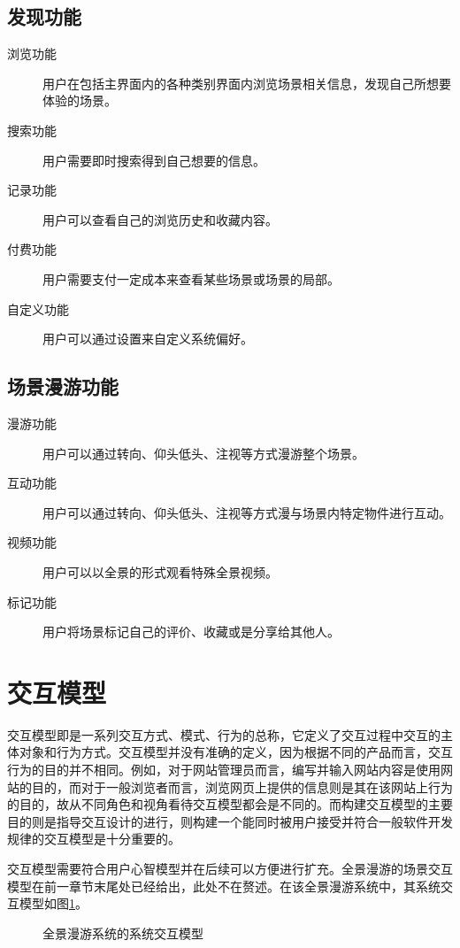 \subsection{发现功能}
\begin{description}
	\item [浏览功能] 用户在包括主界面内的各种类别界面内浏览场景相关信息，发现自己所想要体验的场景。
	\item [搜索功能] 用户需要即时搜索得到自己想要的信息。
	\item [记录功能] 用户可以查看自己的浏览历史和收藏内容。
	\item [付费功能] 用户需要支付一定成本来查看某些场景或场景的局部。
	\item [自定义功能] 用户可以通过设置来自定义系统偏好。
\end{description}

\subsection{场景漫游功能}

\begin{description}
	\item [漫游功能] 用户可以通过转向、仰头低头、注视等方式漫游整个场景。
	\item [互动功能] 用户可以通过转向、仰头低头、注视等方式漫与场景内特定物件进行互动。
	\item [视频功能] 用户可以以全景的形式观看特殊全景视频。
	\item [标记功能] 用户将场景标记自己的评价、收藏或是分享给其他人。
\end{description}

\section{交互模型}
交互模型即是一系列交互方式、模式、行为的总称，它定义了交互过程中交互的主体对象和行为方式。交互模型并没有准确的定义，因为根据不同的产品而言，交互行为的目的并不相同。例如，对于网站管理员而言，编写并输入网站内容是使用网站的目的，而对于一般浏览者而言，浏览网页上提供的信息则是其在该网站上行为的目的，故从不同角色和视角看待交互模型都会是不同的。而构建交互模型的主要目的则是指导交互设计的进行，则构建一个能同时被用户接受并符合一般软件开发规律的交互模型是十分重要的。

交互模型需要符合用户心智模型并在后续可以方便进行扩充。全景漫游的场景交互模型在前一章节末尾处已经给出，此处不在赘述。在该全景漫游系统中，其系统交互模型如图\ref{fig:scene}。

\begin{figure}[htp]
\centering
{}
\caption{全景漫游系统的系统交互模型}
\label{fig:scene}
\end{figure}

